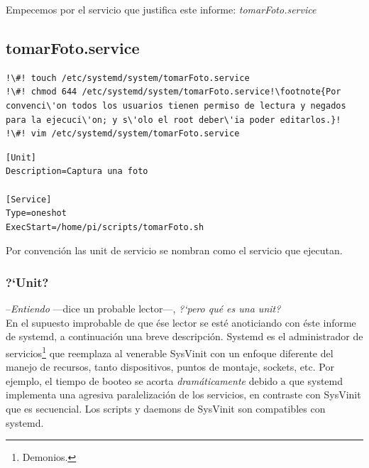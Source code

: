 \documentclass[10pt,a4paper]{article}
\newenvironment{unitFrame}[1][]{%
    \begin{mdframed}[%
        frametitle={#1},
        skipabove=\baselineskip plus 2pt minus 1pt,
        skipbelow=\baselineskip plus 2pt minus 1pt,
        linewidth=0.5pt,
        frametitlerule=true,
        frametitlebackgroundcolor=gray!10
    ]%
}{%
    \end{mdframed}
}
\begin{document}
Empecemos por el servicio que justifica este informe: \emph{tomarFoto.service}\\

\subsection{tomarFoto.service}

\begin{lstlisting}
!\#! touch /etc/systemd/system/tomarFoto.service
!\#! chmod 644 /etc/systemd/system/tomarFoto.service!\footnote{Por convenci\'on todos los usuarios tienen permiso de lectura y negados para la ejecuci\'on; y s\'olo el root deber\'ia poder editarlos.}!
!\#! vim /etc/systemd/system/tomarFoto.service
\end{lstlisting}

\begin{scriptsize}
\begin{unitFrame}[/etc/systemd/system/tomarForo.service]
\begin{verbatim}
[Unit]
Description=Captura una foto

[Service]
Type=oneshot
ExecStart=/home/pi/scripts/tomarFoto.sh
\end{verbatim}
\end{unitFrame}
\end{scriptsize}

Por convenci\'on las unit de servicio se nombran como el servicio que ejecutan.\\

\subsubsection{?`Unit?}

--\emph{Entiendo} ---dice un probable lector---, \emph{?`pero qu\'e es una \emph{unit}?}\\

En el supuesto improbable de que \'ese lector se est\'e anoticiando con \'este informe de systemd, a continuaci\'on una breve descripci\'on. Systemd es el administrador de servicios\footnote{Demonios.} que reemplaza al venerable SysVinit con un enfoque diferente del manejo de recursos, tanto dispositivos, puntos de montaje, sockets, etc. Por ejemplo, el tiempo de booteo se acorta \emph{dram\'aticamente} debido a que systemd implementa una agresiva paralelizaci\'on de los servicios, en contraste con SysVinit que es secuencial. Los scripts y daemons de SysVinit son compatibles con systemd.\\
\end{document}
